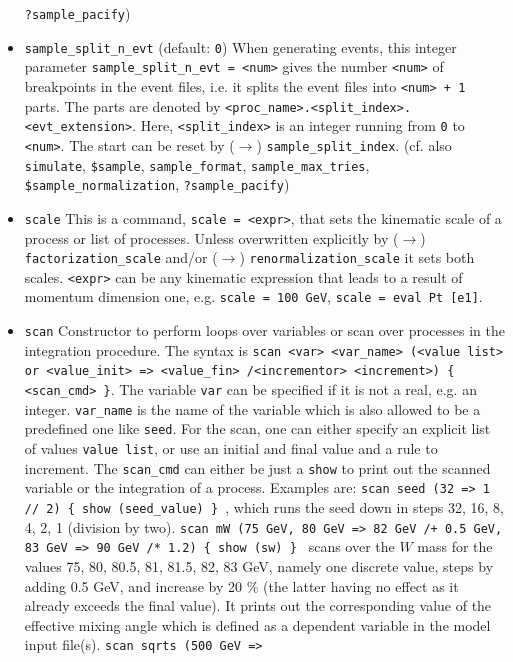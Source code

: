 \documentclass[12pt]{book}
\newcommand{\ttt}[1]{\texttt{#1}}
\begin{document}
\begin{itemize}
\ttt{?sample\_pacify}) 
\item
\ttt{sample\_split\_n\_evt} \qquad (default: \ttt{0}) \newline
When generating events, this integer parameter
\ttt{sample\_split\_n\_evt = <num>} gives the number \ttt{<num>} of
breakpoints in the event files, i.e. it splits the event files into
\ttt{<num> + 1} parts. The parts are denoted by
\ttt{<proc\_name>.<split\_index>.<evt\_extension>}. Here,
\ttt{<split\_index>} is an integer running from \ttt{0} to
\ttt{<num>}. The start can be reset by ($\to$)
\ttt{sample\_split\_index}. (cf. also \ttt{simulate}, \ttt{\$sample},
\ttt{sample\_format}, \ttt{sample\_max\_tries},
\ttt{\$sample\_normalization}, \ttt{?sample\_pacify})
\item
\ttt{scale} \newline
This is a command, \ttt{scale = <expr>}, that sets the kinematic scale
of a process or list of processes. Unless overwritten explicitly by
($\to$) \ttt{factorization\_scale} and/or ($\to$)
\ttt{renormalization\_scale} it sets both scales. \ttt{<expr>} can be
any kinematic expression that leads to a result of momentum dimension
one, e.g. \ttt{scale = 100 GeV}, \ttt{scale = eval Pt [e1]}. 
\item
\ttt{scan} \newline
Constructor to perform loops over variables or scan over processes in
the integration procedure. The syntax is \ttt{scan <var> <var\_name>
  (<value list> or  <value\_init> => <value\_fin> /<incrementor>
  <increment>) \{ <scan\_cmd> \}}. The variable \ttt{var} can be
specified if it is not a real, e.g. an integer. \ttt{var\_name} is the
name of the variable which is also allowed to be a predefined one like
\ttt{seed}. For the scan, one can either specify an explicit list of
values \ttt{value list}, or use an initial and final value and a
rule to increment. The \ttt{scan\_cmd}  can either be just a
\ttt{show} to print out the scanned variable or the integration of a process.
Examples are: \ttt{scan seed (32 => 1 // 2) \{ show (seed\_value) \}
}, which runs the seed down in steps 32, 16, 8, 4, 2, 1 (division by
two). \ttt{scan mW (75 GeV, 80 GeV => 82 GeV /+ 0.5 GeV,  83 GeV => 90
GeV /* 1.2) \{ show (sw) \} } scans over the $W$ mass for the values
75, 80, 80.5, 81, 81.5, 82, 83 GeV, namely one discrete value, steps
by adding 0.5 GeV, and increase by 20 \% (the latter having no effect 
as it already exceeds the final value). It prints out the
corresponding value of the effective mixing angle which is defined as
a dependent variable in the model input file(s). \ttt{scan sqrts (500 GeV =>
}
\end{itemize}
\end{document}
